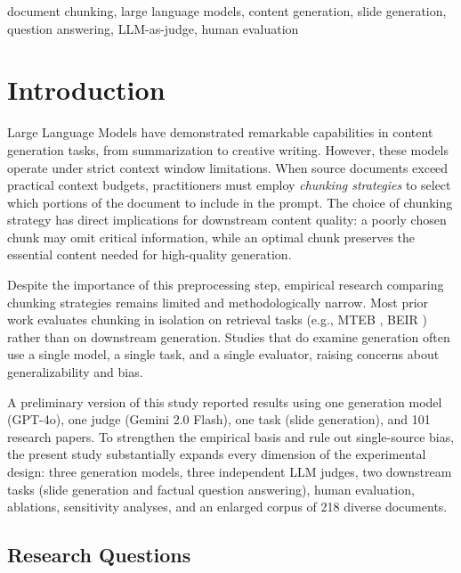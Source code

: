\documentclass[journal]{IEEEtran}
\begin{document}
\begin{IEEEkeywords}
document chunking, large language models, content generation, slide generation, question answering, LLM-as-judge, human evaluation
\end{IEEEkeywords}

\section{Introduction}

Large Language Models have demonstrated remarkable capabilities in content generation tasks, from summarization to creative writing. However, these models operate under strict context window limitations. When source documents exceed practical context budgets, practitioners must employ \textit{chunking strategies} to select which portions of the document to include in the prompt. The choice of chunking strategy has direct implications for downstream content quality: a poorly chosen chunk may omit critical information, while an optimal chunk preserves the essential content needed for high-quality generation.

Despite the importance of this preprocessing step, empirical research comparing chunking strategies remains limited and methodologically narrow. Most prior work evaluates chunking in isolation on retrieval tasks (e.g., MTEB \cite{muennighoff2022mteb}, BEIR \cite{thakur2021beir}) rather than on downstream generation. Studies that do examine generation often use a single model, a single task, and a single evaluator, raising concerns about generalizability and bias.

A preliminary version of this study reported results using one generation model (GPT-4o), one judge (Gemini 2.0 Flash), one task (slide generation), and 101 research papers. To strengthen the empirical basis and rule out single-source bias, the present study substantially expands every dimension of the experimental design: three generation models, three independent LLM judges, two downstream tasks (slide generation and factual question answering), human evaluation, ablations, sensitivity analyses, and an enlarged corpus of 218 diverse documents.

\subsection{Research Questions}
\end{document}
